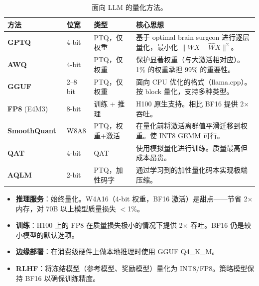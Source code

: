 \begin{table}[ht!]
\centering
\caption{面向 LLM 的量化方法。}
\noindent\begin{tabularx}{\linewidth}{@{}l l l Z{1}@{}}
\toprule
\textbf{方法} & \textbf{位宽} & \textbf{类型} & \textbf{核心思想} \\
\midrule
\textbf{GPTQ}~\cite{frantar2023gptq} & 4-bit & PTQ，仅权重 & 基于 optimal brain surgeon 进行逐层量化，最小化 $\|WX - \hat{W}X\|^2$。 \\[4pt]
\textbf{AWQ}~\cite{lin2024awq} & 4-bit & PTQ，仅权重 & 保护显著权重（与大激活相对应）。1\% 的权重承担 99\% 的重要性。 \\[4pt]
\textbf{GGUF}~\cite{gerganov2023gguf} & 2--8 bit & PTQ，仅权重 & 面向 CPU 优化的格式（llama.cpp）。按 block 量化，支持多种类型。 \\[4pt]
\textbf{FP8} (E4M3) & 8-bit & 训练 + 推理 & H100 原生支持。相比 BF16 提供 2$\times$ 吞吐。 \\[4pt]
\textbf{SmoothQuant}~\cite{xiao2023smoothquant} & W8A8 & PTQ，权重+激活 & 在量化前将激活离群值平滑迁移到权重。使 INT8 GEMM 可行。 \\[4pt]
\textbf{QAT}~\cite{liu2023llmqat} & 4-bit & QAT & 使用模拟量化进行训练。质量最高但成本昂贵。 \\[4pt]
\textbf{AQLM}~\cite{egiazarian2024aqlm} & 2-bit & PTQ，加性码字 & 通过学习到的加性量化码本实现极端压缩。 \\
\bottomrule
\end{tabularx}
\end{table}

\begin{intuitionbox}[何时进行量化]
\begin{itemize}
  \item \textbf{推理服务}：始终量化。W4A16（4-bit 权重，BF16 激活）是甜点——节省 2$\times$ 内存，对 70B 以上模型质量损失 $<$1\%。
  \item \textbf{训练}：H100 上的 FP8 在质量损失极小的情况下提供 2$\times$ 吞吐。BF16 仍是较小模型的默认选项。
  \item \textbf{边缘部署}：在消费级硬件上做本地推理时使用 GGUF Q4\_K\_M。
  \item \textbf{RLHF}：将冻结模型（参考模型、奖励模型）量化为 INT8/FP8。策略模型保持 BF16 以确保训练精度。
\end{itemize}
\end{intuitionbox}

